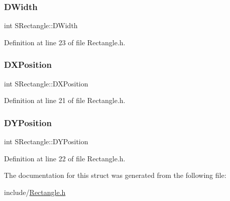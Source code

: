\subsubsection{\texorpdfstring{D\+Width}{DWidth}}
{\footnotesize\ttfamily int S\+Rectangle\+::\+D\+Width}



Definition at line 23 of file Rectangle.\+h.

\hypertarget{structSRectangle_abcbddb03b3ee416cc33109833b5f075c}{}\label{structSRectangle_abcbddb03b3ee416cc33109833b5f075c} 
\subsubsection{\texorpdfstring{D\+X\+Position}{DXPosition}}
{\footnotesize\ttfamily int S\+Rectangle\+::\+D\+X\+Position}



Definition at line 21 of file Rectangle.\+h.

\hypertarget{structSRectangle_a120aa0a90033bc6e07c36c151a3bbc71}{}\label{structSRectangle_a120aa0a90033bc6e07c36c151a3bbc71} 
\subsubsection{\texorpdfstring{D\+Y\+Position}{DYPosition}}
{\footnotesize\ttfamily int S\+Rectangle\+::\+D\+Y\+Position}



Definition at line 22 of file Rectangle.\+h.



The documentation for this struct was generated from the following file\+:\begin{DoxyCompactItemize}
\item 
include/\hyperlink{Rectangle_8h}{Rectangle.\+h}\end{DoxyCompactItemize}
